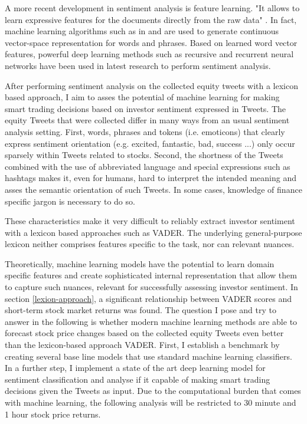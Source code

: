 \documentclass[a4paper,12pt]{article}%
\begin{document}
A more recent development in sentiment analysis is feature learning. "It allows to learn expressive features for the documents directly from the raw data" \citep{Albertini2014}. In fact, machine learning algorithms such as in \citet{Socher2011a} and \citet{Maas2011} are used to generate continuous vector-space representation for words and phrases. Based on learned word vector features, powerful deep learning methods such as recursive and recurrent neural networks have been used in latest research to perform sentiment analysis.

After performing sentiment analysis on the collected equity tweets with a lexicon based approach, I aim to asses the potential of machine learning for making smart trading decisions based on investor sentiment expressed in Tweets. The equity Tweets that were collected differ in many ways from an usual sentiment analysis setting. First, words, phrases and tokens (i.e. emoticons) that clearly express sentiment orientation (e.g. excited, fantastic, bad, success ...) only occur sparsely within Tweets related to stocks. Second, the shortness of the Tweets combined with the use of abbreviated language and special expressions such as hashtags makes it, even for humans, hard to interpret the intended meaning and asses the semantic orientation of such Tweets. In some cases, knowledge of finance specific jargon is necessary to do so.

These characteristics make it very difficult to reliably extract investor sentiment with a lexicon based approaches such as VADER. The underlying general-purpose lexicon neither comprises features specific to the task, nor can relevant nuances.

Theoretically, machine learning models have the potential to learn domain specific features and create sophisticated internal representation that allow them to capture such nuances, relevant for successfully assessing investor sentiment. In section \ref{lexion-approach}, a significant relationship between VADER scores and short-term stock market returns was found. The question I pose and try to answer in the following is whether modern machine learning methods are able to forecast stock price changes based on the collected equity Tweets even better than the lexicon-based approach VADER. First, I establish a benchmark by creating several base line models that use standard machine learning classifiers. In a further step, I implement a state of the art deep learning model for sentiment classification and analyse if it capable of making smart trading decisions given the Tweets as input. Due to the computational burden that comes with machine learning, the following analysis will be restricted to 30 minute and 1 hour stock price returns.
\end{document}
